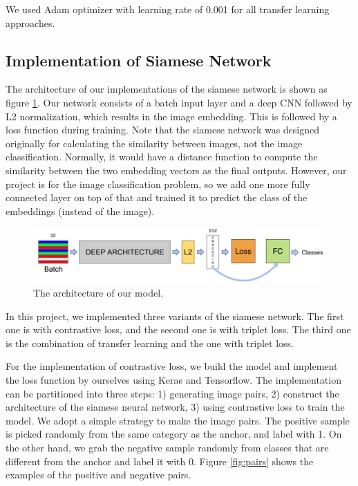 We used Adam optimizer with learning rate of 0.001 for all transfer learning approaches.

\subsection{Implementation of Siamese Network}

The architecture of our implementations of the siamese network is shown as figure \ref{fig:model}. Our network consists of a batch input layer and a deep CNN followed by L2 normalization, which results in the image embedding. This is followed by a loss function during training. Note that the siamese network was designed originally for calculating the similarity between images, not the image classification. Normally, it would have a distance function to compute the similarity between the two embedding vectors as the final outputs. However, our project is for the image classification problem, so we add one more fully connected layer on top of that and trained it to predict the class of the embeddings (instead of the image). 

\begin{figure}[h]
  \centering
  \includegraphics[width=\linewidth]{figs/model.png}
  \caption{The architecture of our model.}
  \label{fig:model}
\end{figure}

In this project, we implemented three variants of the siamese network. The first one is with contrastive loss, and the second one is with triplet loss. The third one is the combination of transfer learning and the one with triplet loss.

For the implementation of contrastive loss, we build the model and implement the loss function by ourselves using Keras and Tensorflow. The implementation can be partitioned into three steps: 1) generating image pairs, 2) construct the architecture of the siamese neural network, 3) using contrastive loss to train the model. We adopt a simple strategy to make the image pairs. The positive sample is picked randomly from the same category as the anchor, and label with 1. On the other hand, we grab the negative sample randomly from classes that are different from the anchor and label it with 0. Figure \ref{fig:pairs} shows the examples of the positive and negative pairs. 


